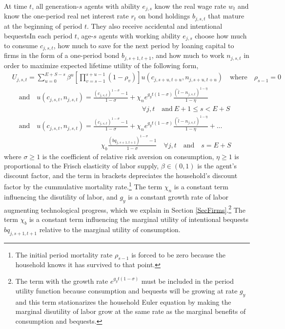 \documentclass[letterpaper,12pt]{article}
\theoremstyle{definition}
\begin{document}
\begin{spacing}{1.5}
    \noindent At time $t$, all generation-$s$ agents with ability $e_{j,s}$ know the real wage rate $w_t$ and know the one-period real net interest rate $r_t$ on bond holdings $b_{j,s,t}$ that mature at the beginning of period $t$. They also receive accidental and intentional bequestsIn each period $t$, age-$s$ agents with working ability $e_{j,s}$ choose how much to consume $c_{j,s,t}$, how much to save for the next period by loaning capital to firms in the form of a one-period bond $b_{j,s+1,t+1}$, and how much to work $n_{j,s,t}$ in order to maximize expected lifetime utility of the following form,
    \begin{equation}\label{EqUtilMax}
      \begin{split}
        &U_{j,s,t} = \sum_{u=0}^{E+S-s}\beta^u\left[\prod_{v=s-1}^{s+u-1}(1-\rho_v)\right] u\left(c_{j,s+u,t+u},n_{j,s+u,t+u}\right) \quad\text{where}\quad \rho_{s-1}=0 \\
        &\quad\text{and} \quad u\left(c_{j,s,t},n_{j,s,t}\right) = \frac{\left(c_{j,s,t}\right)^{1-\sigma} - 1}{1-\sigma} + \chi_n e^{g_y t(1-\sigma)}\frac{(\tilde{l}-n_{j,s,t})^{1-\eta}}{1-\eta} \\
        &\quad\quad\quad\quad\quad\quad\quad\quad\quad\quad\quad\quad\quad\quad\quad\quad\quad\quad\quad\forall j,t\quad\text{and}\:E+1\leq s< E+S \\
        &\quad\text{and}\quad u\left(c_{j,s,t},n_{j,s,t}\right) = \frac{\left(c_{j,s,t}\right)^{1-\sigma} - 1}{1-\sigma} + \chi_n e^{g_y t(1-\sigma)}\frac{(\tilde{l}-n_{j,s,t})^{1-\eta}}{1-\eta} + ... \\
        &\quad\quad\quad\quad\quad\quad\quad\quad\quad\quad\quad\quad\quad \chi_b\frac{\left(bq_{j,s+1,t+1}\right)^{1-\sigma} - 1}{1-\sigma} \quad\forall j,t\quad\text{and}\quad s=E+S
      \end{split}
    \end{equation}
    where $\sigma\geq 1$ is the coefficient of relative risk aversion on consumption, $\eta\geq 1$ is proportional to the Frisch elasticity of labor supply, $\beta\in(0,1)$ is the agent's discount factor, and the term in brackets depreciates the household's discount factor by the cummulative mortality rate.\footnote{The initial period mortality rate $\rho_{s-1}$ is forced to be zero because the household knows it has survived to that point.} The term $\chi_n$ is a constant term influencing the disutility of labor, and $g_y$ is a constant growth rate of labor augmenting technological progress, which we explain in Section \ref{SecFirms}.\footnote{The term with the growth rate $e^{g_y t(1-\sigma)}$ must be included in the period utility function because consumption and bequests will be growing at rate $g_y$ and this term stationarizes the household Euler equation by making the marginal disutility of labor grow at the same rate as the marginal benefits of consumption and bequests.} The term $\chi_b$ is a constant term influencing the marginal utility of intentional bequests $bq_{j,s+1,t+1}$ relative to the marginal utility of consumption.


\end{spacing}
\end{document}
